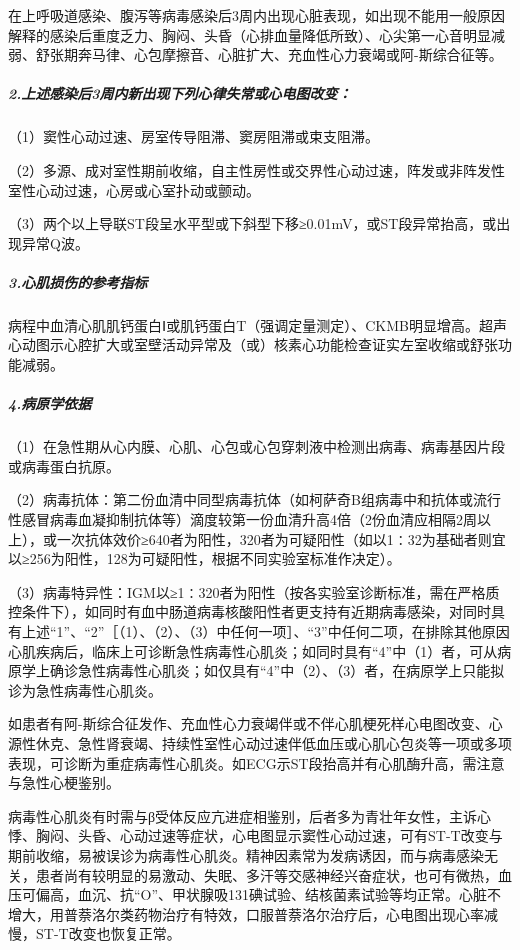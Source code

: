 在上呼吸道感染、腹泻等病毒感染后3周内出现心脏表现，如出现不能用一般原因解释的感染后重度乏力、胸闷、头昏（心排血量降低所致）、心尖第一心音明显减弱、舒张期奔马律、心包摩擦音、心脏扩大、充血性心力衰竭或阿-斯综合征等。

\subparagraph{2.上述感染后3周内新出现下列心律失常或心电图改变：}

（1）窦性心动过速、房室传导阻滞、窦房阻滞或束支阻滞。

（2）多源、成对室性期前收缩，自主性房性或交界性心动过速，阵发或非阵发性室性心动过速，心房或心室扑动或颤动。

（3）两个以上导联ST段呈水平型或下斜型下移≥0.01mV，或ST段异常抬高，或出现异常Q波。

\subparagraph{3.心肌损伤的参考指标}

病程中血清心肌肌钙蛋白Ⅰ或肌钙蛋白T（强调定量测定）、CKMB明显增高。超声心动图示心腔扩大或室壁活动异常及（或）核素心功能检查证实左室收缩或舒张功能减弱。

\subparagraph{4.病原学依据}

（1）在急性期从心内膜、心肌、心包或心包穿刺液中检测出病毒、病毒基因片段或病毒蛋白抗原。

（2）病毒抗体：第二份血清中同型病毒抗体（如柯萨奇B组病毒中和抗体或流行性感冒病毒血凝抑制抗体等）滴度较第一份血清升高4倍（2份血清应相隔2周以上），或一次抗体效价≥640者为阳性，320者为可疑阳性（如以1∶32为基础者则宜以≥256为阳性，128为可疑阳性，根据不同实验室标准作决定）。

（3）病毒特异性：IGM以≥1∶320者为阳性（按各实验室诊断标准，需在严格质控条件下），如同时有血中肠道病毒核酸阳性者更支持有近期病毒感染，对同时具有上述“1”、“2”［（1）、（2）、（3）中任何一项］、“3”中任何二项，在排除其他原因心肌疾病后，临床上可诊断急性病毒性心肌炎；如同时具有“4”中（1）者，可从病原学上确诊急性病毒性心肌炎；如仅具有“4”中（2）、（3）者，在病原学上只能拟诊为急性病毒性心肌炎。

如患者有阿-斯综合征发作、充血性心力衰竭伴或不伴心肌梗死样心电图改变、心源性休克、急性肾衰竭、持续性室性心动过速伴低血压或心肌心包炎等一项或多项表现，可诊断为重症病毒性心肌炎。如ECG示ST段抬高并有心肌酶升高，需注意与急性心梗鉴别。

病毒性心肌炎有时需与β受体反应亢进症相鉴别，后者多为青壮年女性，主诉心悸、胸闷、头昏、心动过速等症状，心电图显示窦性心动过速，可有ST-T改变与期前收缩，易被误诊为病毒性心肌炎。精神因素常为发病诱因，而与病毒感染无关，患者尚有较明显的易激动、失眠、多汗等交感神经兴奋症状，也可有微热，血压可偏高，血沉、抗“O”、甲状腺吸131碘试验、结核菌素试验等均正常。心脏不增大，用普萘洛尔类药物治疗有特效，口服普萘洛尔治疗后，心电图出现心率减慢，ST-T改变也恢复正常。

